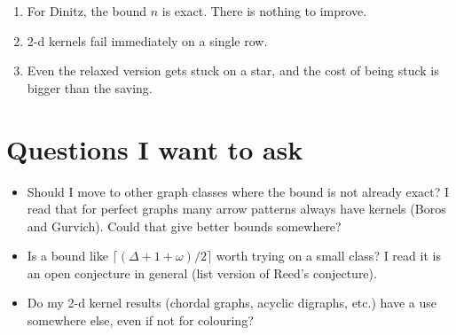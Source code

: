 \documentclass[11pt,a4paper]{article}
\begin{document}
\begin{enumerate}[leftmargin=1.4em]
    \item For Dinitz, the bound $n$ is exact. There is nothing to improve.
    \item 2-d kernels fail immediately on a single row.
    \item Even the relaxed version gets stuck on a star, and the cost of being stuck is bigger than the saving.
\end{enumerate}

\section*{Questions I want to ask}

\begin{itemize}[leftmargin=1.4em]
    \item Should I move to other graph classes where the bound is not already exact? I read that for perfect graphs many arrow patterns always have kernels (Boros and Gurvich). Could that give better bounds somewhere?
    \item Is a bound like $\lceil(\Delta+1+\omega)/2\rceil$ worth trying on a small class? I read it is an open conjecture in general (list version of Reed's conjecture).
    \item Do my 2-d kernel results (chordal graphs, acyclic digraphs, etc.) have a use somewhere else, even if not for colouring?
\end{itemize}
\end{document}
